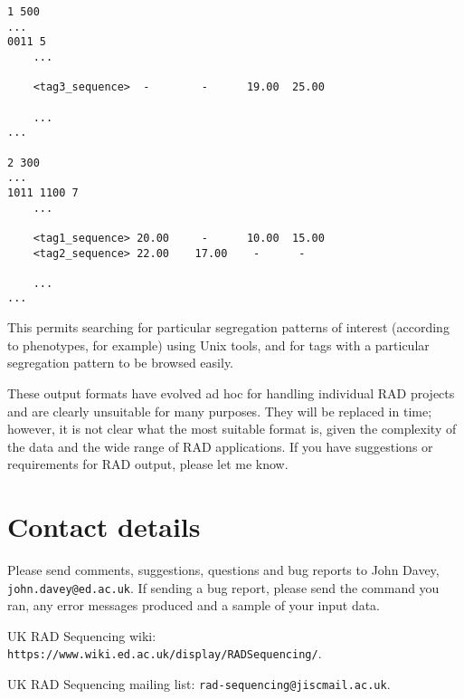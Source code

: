 \documentclass[a4paper]{article}
\begin{document}
\begin{verbatim}
1 500
...
0011 5
    ...

    <tag3_sequence>  -        -      19.00  25.00

    ...
...

2 300
...
1011 1100 7
    ...

    <tag1_sequence> 20.00     -      10.00  15.00
    <tag2_sequence> 22.00    17.00    -      -

    ...
...
\end{verbatim}

This permits searching for particular segregation patterns of interest (according to phenotypes, for example) using Unix tools, and for tags with a particular segregation pattern to be browsed easily.

These output formats have evolved ad hoc for handling individual RAD projects and are clearly unsuitable for many purposes. They will be replaced in time; however, it is not clear what the most suitable format is, given the complexity of the data and the wide range of RAD applications. If you have suggestions or requirements for RAD output, please let me know.


\section{Contact details}

Please send comments, suggestions, questions and bug reports to John Davey, \verb|john.davey@ed.ac.uk|. If sending a bug report, please send the command you ran, any error messages produced and a sample of your input data.

UK RAD Sequencing wiki: \verb|https://www.wiki.ed.ac.uk/display/RADSequencing/|.

UK RAD Sequencing mailing list: \verb|rad-sequencing@jiscmail.ac.uk|.
\end{document}
